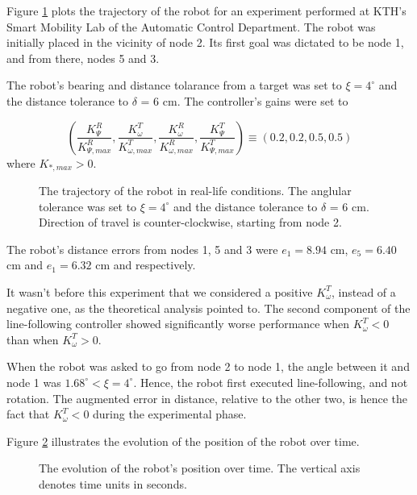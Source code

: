 Figure \ref{fig:22_map_7} plots the trajectory of the robot for an experiment
performed at KTH's Smart Mobility Lab of the Automatic Control Department. The
robot was initially placed in the vicinity of node 2. Its first goal was
dictated to be node 1, and from there, nodes 5 and 3.

The robot's bearing and distance tolarance from a target was set to
$\xi = 4^{\circ}$ and the distance tolerance to $\delta$ = 6 cm. The controller's
gains were set to

$$(\dfrac{K_{\Psi}^R}{K_{\Psi,max}^R}, \dfrac{K_{\omega}^T}{K_{\omega, max}^T}, \dfrac{K_{\omega}^R}{K_{\omega,max}^R}, \dfrac{K_{\Psi}^T}{K_{\Psi,max}^T})
\equiv (0.2, 0.2, 0.5, 0.5)$$
where $K_{*,max} > 0$.

\begin{figure}\centering
  \scalebox{1}{}
  \caption{The trajectory of the robot in real-life conditions. The anglular
    tolerance was set to $\xi = 4^{\circ}$ and the distance tolerance to
    $\delta$ = 6 cm. Direction of travel is counter-clockwise, starting from node 2.}
  \label{fig:22_map_7}
\end{figure}

The robot's distance errors from nodes 1, 5 and 3 were $e_1 = 8.94$ cm,
$e_5 = 6.40$ cm and $e_1 = 6.32$ cm and respectively.

It wasn't before this experiment that we considered a
positive $K_{\omega}^T$, instead of a negative one, as the theoretical analysis
pointed to. The second component of the line-following controller showed
significantly worse performance when $K_{\omega}^T < 0$ than when $K_{\omega}^T > 0$.

When the robot was asked to go from node 2 to node 1, the angle between it and
node 1 was $1.68^{\circ} < \xi = 4^{\circ}$. Hence, the robot first executed
line-following, and not rotation. The augmented error in distance,
relative to the other two, is hence the fact that $K_{\omega}^T < 0$ during the
experimental phase.

Figure \ref{fig:22_map_7_xyt} illustrates the evolution of the position of the
robot over time.

\begin{figure}[H]\centering
  \scalebox{0.7}{}
  \caption{The evolution of the robot's position over time. The vertical axis
    denotes time units in seconds.}
  \label{fig:22_map_7_xyt}
\end{figure}

